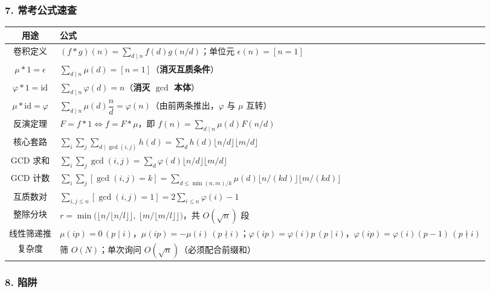\hrulefill

\subsubsection*{7. 常考公式速查}

\begin{center}
\begin{tabular}{|c|p{10.2cm}|}
\hline
\textbf{用途} & \textbf{公式} \\
\hline
卷积定义 & $(f*g)(n) = \sum_{d \mid n}f(d)g(n/d)$；单位元 $\epsilon(n)=[n=1]$ \\
\hline
$\mu * 1 = \epsilon$ & $\sum_{d\mid n}\mu(d) = [n=1]$（\textbf{消灭互质条件}）\\
\hline
$\varphi * 1 = \mathrm{id}$ & $\sum_{d\mid n}\varphi(d) = n$（\textbf{消灭 $\gcd$ 本体}）\\
\hline
$\mu * \mathrm{id} = \varphi$ & $\sum_{d\mid n}\mu(d)\dfrac nd = \varphi(n)$（由前两条推出，$\varphi$ 与 $\mu$ 互转）\\
\hline
反演定理 & $F = f*1 \iff f = F*\mu$，即 $f(n) = \sum_{d\mid n}\mu(d)F(n/d)$ \\
\hline
核心套路 & $\sum_i\sum_j\sum_{d\mid\gcd(i,j)}h(d) = \sum_d h(d)\lfloor n/d\rfloor\lfloor m/d\rfloor$ \\
\hline
GCD 求和 & $\sum_i\sum_j \gcd(i,j) = \sum_d \varphi(d)\lfloor n/d\rfloor\lfloor m/d\rfloor$ \\
\hline
GCD 计数 & $\sum_i\sum_j[\gcd(i,j)=k] = \sum_{d \le \min(n,m)/k}\mu(d)\lfloor n/(kd)\rfloor\lfloor m/(kd)\rfloor$ \\
\hline
互质数对 & $\sum_{i,j \le n}[\gcd(i,j)=1] = 2\sum_{i\le n}\varphi(i) - 1$ \\
\hline
整除分块 & $r = \min\!\big(\lfloor n/\lfloor n/l\rfloor\rfloor,\ \lfloor m/\lfloor m/l\rfloor\rfloor\big)$，共 $O(\sqrt n)$ 段 \\
\hline
线性筛递推 & $\mu(ip)=0\,(p\mid i)$，$\mu(ip)=-\mu(i)\,(p\nmid i)$；$\varphi(ip)=\varphi(i)p\,(p\mid i)$，$\varphi(ip)=\varphi(i)(p-1)\,(p\nmid i)$ \\
\hline
复杂度 & 筛 $O(N)$；单次询问 $O(\sqrt n)$（必须配合前缀和） \\
\hline
\end{tabular}
\end{center}

\hrulefill

\subsubsection*{8. 陷阱}

